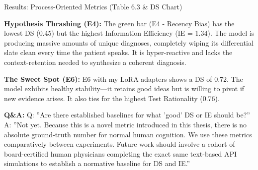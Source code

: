 \documentclass[aspectratio=169,11pt]{beamer}
\begin{document}
\begin{frame}{Results: Process-Oriented Metrics (Table 6.3 \& DS Chart)}
{\textbf{Hypothesis Thrashing (E4):} The green bar (E4 - Recency Bias) has the lowest DS (0.45) but the highest Information Efficiency (IE = 1.34). The model is producing massive amounts of unique diagnoses, completely wiping its differential slate clean every time the patient speaks. It is hyper-reactive and lacks the context-retention needed to synthesize a coherent diagnosis.

\textbf{The Sweet Spot (E6):} E6 with my LoRA adapters shows a DS of 0.72. The model exhibits healthy stability—it retains good ideas but is willing to pivot if new evidence arises. It also ties for the highest Test Rationality (0.76).

\textbf{Q\&A:}
Q: ''Are there established baselines for what 'good' DS or IE should be?''
A: ''Not yet. Because this is a novel metric introduced in this thesis, there is no absolute ground-truth number for normal human cognition. We use these metrics comparatively between experiments. Future work should involve a cohort of board-certified human physicians completing the exact same text-based API simulations to establish a normative baseline for DS and IE.''
}
\end{frame}
\end{document}
